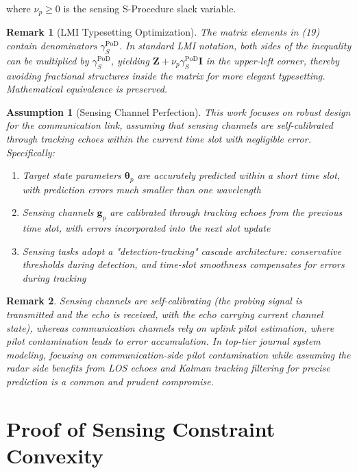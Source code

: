 \documentclass[12pt,a4paper]{article}
\newtheorem{assumption}{Assumption}
\newtheorem{remark}{Remark}
\newcommand{\vect}[1]{\mathbf{#1}}
\newcommand{\mat}[1]{\mathbf{#1}}
\begin{document}
where $\nu_p \geq 0$ is the sensing S-Procedure slack variable.

\begin{remark}[LMI Typesetting Optimization]
The matrix elements in (19) contain denominators $\gamma_S^{\text{PoD}}$. In standard LMI notation, both sides of the inequality can be multiplied by $\gamma_S^{\text{PoD}}$, yielding $\mat{Z} + \nu_p \gamma_S^{\text{PoD}} \mat{I}$ in the upper-left corner, thereby avoiding fractional structures inside the matrix for more elegant typesetting. Mathematical equivalence is preserved.
\end{remark}

\begin{assumption}[Sensing Channel Perfection]\label{ass:2}
This work focuses on robust design for the communication link, assuming that sensing channels are self-calibrated through tracking echoes within the current time slot with negligible error. Specifically:
\begin{enumerate}
    \item Target state parameters $\boldsymbol{\theta}_p$ are accurately predicted within a short time slot, with prediction errors much smaller than one wavelength
    \item Sensing channels $\vect{g}_p$ are calibrated through tracking echoes from the previous time slot, with errors incorporated into the next slot update
    \item Sensing tasks adopt a "detection-tracking" cascade architecture: conservative thresholds during detection, and time-slot smoothness compensates for errors during tracking
\end{enumerate}
\end{assumption}

\begin{remark}
Sensing channels are self-calibrating (the probing signal is transmitted and the echo is received, with the echo carrying current channel state), whereas communication channels rely on uplink pilot estimation, where pilot contamination leads to error accumulation. In top-tier journal system modeling, focusing on communication-side pilot contamination while assuming the radar side benefits from LOS echoes and Kalman tracking filtering for precise prediction is a common and prudent compromise.
\end{remark}

\section{Proof of Sensing Constraint Convexity}
\end{document}
